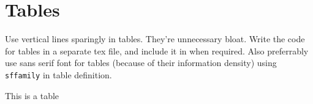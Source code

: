 \clearpage

\section{Tables}

Use vertical lines sparingly in tables. They're unnecessary bloat. Write the code for tables in a separate tex file, and include it in when required. 
Also preferrably use sans serif font for tables (because of their information density) using \texttt{\\sffamily} in table definition.

\begin{table}[!ht]
\small
\centering
\sffamily

\caption{This is a table}
\label{tab:table}
\vspace{-5mm}
\end{table}

